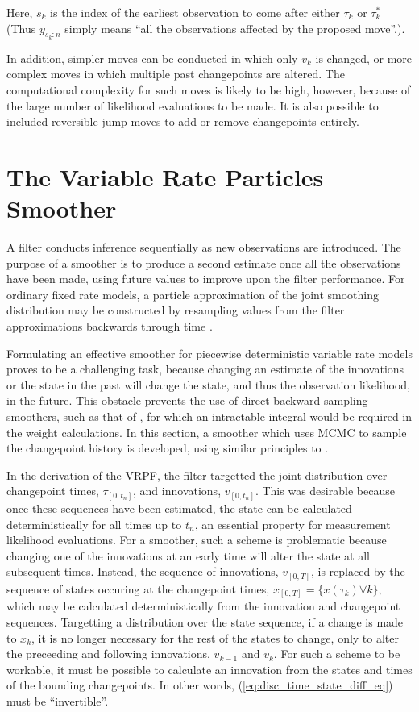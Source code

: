 \documentclass[journal]{IEEEtran}
\begin{document}
Here, $s_k$ is the index of the earliest observation to come after either $\tau_k$ or $\tau_k^*$ (Thus $y_{s_k:n}$ simply means ``all the observations affected by the proposed move''.).

In addition, simpler moves can be conducted in which only $v_k$ is changed, or more complex moves in which multiple past changepoints are altered. The computational complexity for such moves is likely to be high, however, because of the large number of likelihood evaluations to be made. It is also possible to included reversible jump moves \cite{Green1995} to add or remove changepoints entirely.



\section{The Variable Rate Particles Smoother}

A filter conducts inference sequentially as new observations are introduced. The purpose of a smoother is to produce a second estimate once all the observations have been made, using future values to improve upon the filter performance. For ordinary fixed rate models, a particle approximation of the joint smoothing distribution may be constructed by resampling values from the filter approximations backwards through time \cite{Godsill2004}.

Formulating an effective smoother for piecewise deterministic variable rate models proves to be a challenging task, because changing an estimate of the innovations or the state in the past will change the state, and thus the observation likelihood, in the future. This obstacle prevents the use of direct backward sampling smoothers, such as that of \cite{Godsill2004}, for which an intractable integral would be required in the weight calculations. In this section, a smoother which uses MCMC to sample the changepoint history is developed, using similar principles to \cite{Bunch2012}.

In the derivation of the VRPF, the filter targetted the joint distribution over changepoint times, $\tau_{[0,t_n]}$, and innovations, $v_{[0,t_n]}$. This was desirable because once these sequences have been estimated, the state can be calculated deterministically for all times up to $t_n$, an essential property for measurement likelihood evaluations. For a smoother, such a scheme is problematic because changing one of the innovations at an early time will alter the state at all subsequent times. Instead, the sequence of innovations, $v_{[0,T]}$, is replaced by the sequence of states occuring at the changepoint times, $x_{[0,T]} = \{ x(\tau_k) \forall k \}$, which may be calculated deterministically from the innovation and changepoint sequences. Targetting a distribution over the state sequence, if a change is made to $x_k$, it is no longer necessary for the rest of the states to change, only to alter the preceeding and following innovations, $v_{k-1}$ and $v_{k}$. For such a scheme to be workable, it must be possible to calculate an innovation from the states and times of the bounding changepoints. In other words, (\ref{eq:disc_time_state_diff_eq}) must be ``invertible''.
\end{document}
